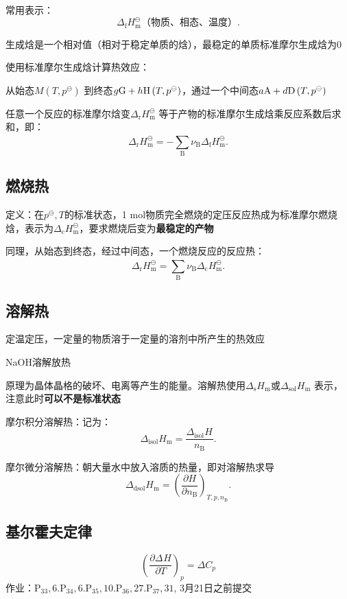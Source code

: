 常用表示：
\[
    \Delta_\text{f}H_{\text{m}}^\ominus \text{（物质、相态、温度）}
.\]
\begin{notation}
    生成焓是一个相对值（相对于稳定单质的焓），最稳定的单质标准摩尔生成焓为0
\end{notation}
使用标准摩尔生成焓计算热效应：
\begin{eg}
    从始态$M\left( T,p^\ominus \right)$ 到终态$g\ce{G}+h\ce{H}\left( T,p^\ominus \right)$，通过一个中间态$a\ce{A}+d \ce{D}\left( T,p^\ominus \right)$
\end{eg}
任意一个反应的标准摩尔焓变$\Delta_\text{r}H_{\text{m}}^\ominus $ 等于产物的标准摩尔生成焓乘反应系数后求和，即：\[
    \Delta_\text{r}H_{\text{m}}^\ominus = -\sum_\text{B}^{} \nu_\text{B}\Delta_\text{f}H_{\text{m}}^\ominus 
.\]
\subsection{燃烧热}%
\label{sub:燃烧热}
定义：在$p^\ominus,T$的标准状态，1 mol物质完全燃烧的定压反应热成为标准摩尔燃烧焓，表示为$\Delta_\text{c}H_{\text{m}}^\ominus $，要求燃烧后变为\textbf{最稳定的产物}

同理，从始态到终态，经过中间态，一个燃烧反应的反应热：\[
    \Delta_\text{r}H_{\text{m}}^\ominus = \sum_\text{B}^{} \nu_\text{B}\Delta_\text{c}H_{\text{m}}^\ominus 
.\]
\subsection{溶解热}%
\label{sub:溶解热}
定温定压，一定量的物质溶于一定量的溶剂中所产生的热效应
\begin{eg}
    NaOH溶解放热
\end{eg}
原理为晶体晶格的破坏、电离等产生的能量。溶解热使用$\Delta_\text{s}H_{\text{m}} $或$\Delta_\text{sol}H_{\text{m}} $ 表示，注意此时\textbf{可以不是标准状态}
\begin{defi}
摩尔积分溶解热：记为：\[
    \Delta_\text{isol}H_{\text{m}} = \frac{\Delta_\text{isol}H_{}}{n_\text{B}}
.\]

摩尔微分溶解热：朝大量水中放入溶质的热量，即对溶解热求导\[
    \Delta_\text{dsol}H_{\text{m}} = \left(\frac{\partial H}{\partial n_\text{B}}\right)_{T,p,n_\text{B}} 
.\]
\end{defi}
\subsection{基尔霍夫定律}%
\label{sub:基尔霍夫定律}
\begin{equation}
    \label{eq:基尔霍夫定律}
    \left(\frac{\partial \Delta_\text{}H }{\partial T}\right)_{p} = \Delta C_{p}
\end{equation}
作业：$\text{P}_{33},6. \text{P}_{34}, 6. \text{P}_{35}, 10. \text{P}_{36}, 27. \text{P}_{37}, 31$, 3月21日之前提交
